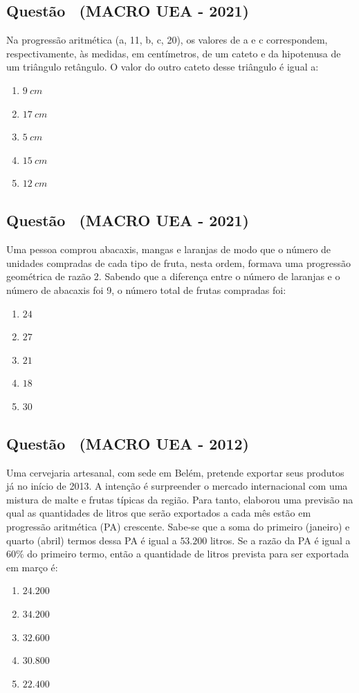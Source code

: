 \documentclass[12pt]{article}
\newcounter{questao}
\newcommand{\novaquestao}[1]{%
  \stepcounter{questao}%
  \subsection*{Questão \thequestao\ (#1)}%
}
\begin{document}
\begin{multicols}{2}
        \novaquestao{MACRO UEA - 2021}
            Na progressão aritmética (a, 11, b, c, 20), os valores de a e c correspondem, respectivamente, às medidas, em centímetros, de um cateto e da hipotenusa de um triângulo retângulo. O valor do outro cateto desse triângulo é igual a:
        
            \begin{enumerate}[label=(\alph*), noitemsep]
                \item $9 \ cm$
                \item $17 \ cm$
                \item $5 \ cm$
                \item $15 \ cm$
                \item $12 \ cm$
            \end{enumerate}
        
        \novaquestao{MACRO UEA - 2021}
            Uma pessoa comprou abacaxis, mangas e laranjas de modo que o número de unidades compradas de cada tipo de fruta, nesta ordem, formava uma progressão geométrica de razão 2. Sabendo que a diferença entre o número de laranjas e o número de abacaxis foi 9, o número total de frutas compradas foi:
        
            \begin{enumerate}[label=(\alph*), noitemsep]
                \item $24$
                \item $27$
                \item $21$
                \item $18$
                \item $30$
            \end{enumerate}
        
        \novaquestao{MACRO UEA - 2012}
        
            Uma cervejaria artesanal, com sede em Belém, pretende exportar seus produtos já no início de 2013. A intenção é surpreender o mercado internacional com uma mistura de malte e frutas típicas da região. Para tanto, elaborou uma previsão na qual as quantidades de litros que serão exportados a cada mês estão em progressão aritmética (PA) crescente. 
            Sabe-se que a soma do primeiro (janeiro) e quarto (abril) termos dessa PA é igual a $53.200$ litros. Se a razão da PA é igual a $60\%$ do primeiro termo, então a quantidade de litros prevista para ser exportada em março é:
        
            \begin{enumerate}[label=(\alph*), noitemsep]
                \item $24.200$
                \item $34.200$
                \item $32.600$
                \item $30.800$
                \item $22.400$
            \end{enumerate}
        

\end{multicols}
\end{document}
